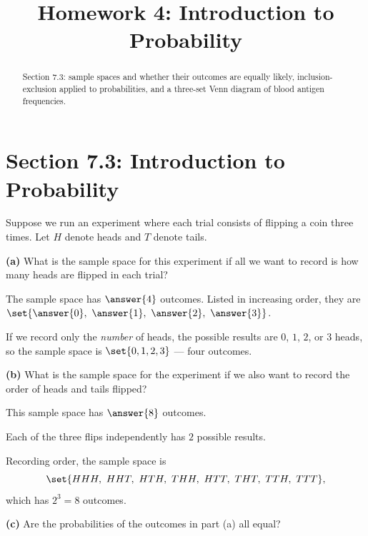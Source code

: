 \documentclass[12pt]{ximera}
\title{Homework 4: Introduction to Probability}
\begin{document}
\begin{abstract}
Section 7.3: sample spaces and whether their outcomes are equally likely,
inclusion-exclusion applied to probabilities, and a three-set Venn diagram of blood
antigen frequencies.
\end{abstract}
\maketitle

\section*{Section 7.3: Introduction to Probability}

\begin{problem}
Suppose we run an experiment where each trial consists of flipping a coin three
times. Let $H$ denote heads and $T$ denote tails.

\begin{prompt}
\textbf{(a)} What is the sample space for this experiment if all we want to record
is how many heads are flipped in each trial?

The sample space has $\answer{4}$ outcomes. Listed in increasing order, they are
$\set{\answer{0},\ \answer{1},\ \answer{2},\ \answer{3}}$.

\begin{feedback}
If we record only the \emph{number} of heads, the possible results are
$0$, $1$, $2$, or $3$ heads, so the sample space is $\set{0,1,2,3}$ --- four
outcomes.
\end{feedback}
\end{prompt}

\begin{prompt}
\textbf{(b)} What is the sample space for the experiment if we also want to record
the order of heads and tails flipped?

This sample space has $\answer{8}$ outcomes.

\begin{hint}
Each of the three flips independently has $2$ possible results.
\end{hint}

\begin{feedback}
Recording order, the sample space is
\[
\set{HHH,\ HHT,\ HTH,\ THH,\ HTT,\ THT,\ TTH,\ TTT},
\]
which has $2^3=8$ outcomes.
\end{feedback}
\end{prompt}

\begin{prompt}
\textbf{(c)} Are the probabilities of the outcomes in part (a) all equal?


\end{prompt}
\end{problem}
\end{document}
